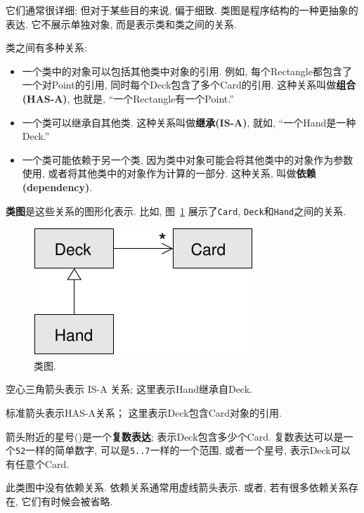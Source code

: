 \documentclass[10pt]{book}
\begin{document}
它们通常很详细; 但对于某些目的来说, 偏于细致. 
类图是程序结构的一种更抽象的表达. 
它不展示单独对象, 而是表示类和类之间的关系. 

类之间有多种关系:

\begin{itemize}

\item 一个类中的对象可以包括其他类中对象的引用. 
例如, 每个Rectangle都包含了一个对Point的引用,
同时每个Deck包含了多个Card的引用. 
这种关系叫做{\bf 组合(HAS-A)}, 也就是, ``一个Rectangle有一个Point.''

\item 一个类可以继承自其他类. 
这种关系叫做{\bf 继承(IS-A)}, 就如, ``一个Hand是一种Deck.''

\item 一个类可能依赖于另一个类, 因为类中对象可能会将其他类中的对象作为参数
使用, 或者将其他类中的对象作为计算的一部分. 
这种关系, 叫做{\bf 依赖(dependency)}.

\end{itemize}

{\bf 类图}是这些关系的图形化表示. 比如, 图~\ref{fig.class1} 
展示了{\tt Card}, {\tt Deck}和{\tt Hand}之间的关系. 

\begin{figure}
\centerline
{\includegraphics[scale=0.8]{figs/class1.pdf}}
\caption{类图.}
\label{fig.class1}
\end{figure}

空心三角箭头表示 IS-A 关系;
这里表示Hand继承自Deck. 

标准箭头表示HAS-A关系；
这里表示Deck包含Card对象的引用. 

箭头附近的星号({\tt *})是一个{\bf 复数表达};
表示Deck包含多少个Card. 
复数表达可以是一个{\tt 52}一样的简单数字, 
可以是{\tt 5..7}一样的一个范围, 
或者一个星号, 表示Deck可以有任意个Card. 

此类图中没有依赖关系. 
依赖关系通常用虚线箭头表示. 
或者, 若有很多依赖关系存在, 它们有时候会被省略. 
\end{document}
